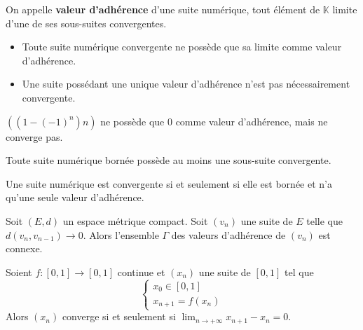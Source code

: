 	\begin{definition}
		On appelle \textbf{valeur d'adhérence} d'une suite numérique, tout élément de $\mathbb{K}$ limite d'une de ses sous-suites convergentes.
	\end{definition}

	\begin{remark}
		\begin{itemize}
			\item Toute suite numérique convergente ne possède que sa limite comme valeur d'adhérence.
			\item Une suite possédant une unique valeur d'adhérence n'est pas nécessairement convergente.
		\end{itemize}
	\end{remark}

	\begin{example}
		$((1 - (-1)^n)n)$ ne possède que $0$ comme valeur d'adhérence, mais ne converge pas.
	\end{example}


	\begin{theorem}
		Toute suite numérique bornée possède au moins une sous-suite convergente.
	\end{theorem}


	\begin{proposition}
		Une suite numérique est convergente si et seulement si elle est bornée et n'a qu'une seule valeur d'adhérence.
	\end{proposition}


	\begin{application}
		Soit $(E, d)$ un espace métrique compact. Soit $(v_n)$ une suite de $E$ telle que $d(v_n,v_{n-1}) \longrightarrow 0$. Alors l'ensemble $\Gamma$ des valeurs d'adhérence de $(v_n)$ est connexe.
	\end{application}

	\begin{corollary}
		Soient $f : [0, 1] \rightarrow [0, 1]$ continue et $(x_n)$ une suite de $[0, 1]$ tel que
		\[ \begin{cases} x_0 \in [0, 1] \\ x_{n+1} = f(x_n) \end{cases} \]
		Alors $(x_n)$ converge si et seulement si $\lim_{n \rightarrow +\infty } x_{n+1} - x_n = 0$.
	\end{corollary}

